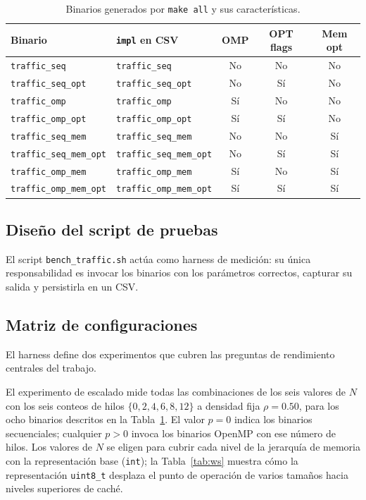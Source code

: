 \begin{table}[H]
\centering
\caption{Binarios generados por \texttt{make all} y sus características.}
\label{tab:binarios}
\begin{tabular}{llccc}
\hline
Binario & \texttt{impl} en CSV & OMP & OPT flags & Mem opt \\
\hline
\texttt{traffic\_seq}         & \texttt{traffic\_seq}         & No  & No  & No \\
\texttt{traffic\_seq\_opt}    & \texttt{traffic\_seq\_opt}    & No  & Sí  & No \\
\texttt{traffic\_omp}         & \texttt{traffic\_omp}         & Sí  & No  & No \\
\texttt{traffic\_omp\_opt}    & \texttt{traffic\_omp\_opt}    & Sí  & Sí  & No \\
\texttt{traffic\_seq\_mem}    & \texttt{traffic\_seq\_mem}    & No  & No  & Sí \\
\texttt{traffic\_seq\_mem\_opt} & \texttt{traffic\_seq\_mem\_opt} & No & Sí & Sí \\
\texttt{traffic\_omp\_mem}    & \texttt{traffic\_omp\_mem}    & Sí  & No  & Sí \\
\texttt{traffic\_omp\_mem\_opt} & \texttt{traffic\_omp\_mem\_opt} & Sí & Sí & Sí \\
\hline
\end{tabular}
\end{table}

\subsection{Diseño del script de pruebas}

El script \texttt{bench\_traffic.sh} actúa como harness de medición: su
única responsabilidad es invocar los binarios con los parámetros correctos,
capturar su salida y persistirla en un CSV. 

\subsection{Matriz de configuraciones}

El harness define dos experimentos que cubren las preguntas de rendimiento
centrales del trabajo.

El experimento de escalado mide todas las combinaciones de los seis
valores de $N$ con los seis conteos de hilos $\{0, 2, 4, 6, 8, 12\}$ a
densidad fija $\rho = 0.50$, para los ocho binarios descritos en la
Tabla~\ref{tab:binarios}. El valor $p = 0$ indica los binarios secuenciales;
cualquier $p > 0$ invoca los binarios OpenMP con ese número de hilos. Los
valores de $N$ se eligen para cubrir cada nivel de la jerarquía de
memoria con la representación base (\texttt{int}); la
Tabla~\ref{tab:ws} muestra cómo la representación \texttt{uint8\_t} desplaza
el punto de operación de varios tamaños hacia niveles superiores de caché.

